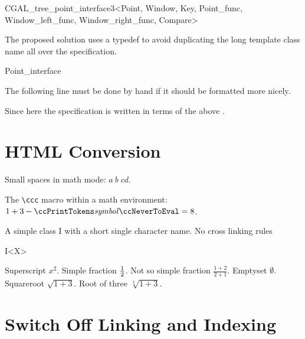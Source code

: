 \documentclass[12pt]{article}
\begin{document}
{\begin{ccClassTemplate}{CGAL_tree_point_interface3<Point, Window, Key,  
         Point_func, Window_left_func, 
         Window_right_func, Compare>}
\def\ccLongParamLayout{\ccTrue}
\def\ccLongParamLayout{\ccFalse}
\end{ccClassTemplate}

The proposed solution uses a typedef to avoid duplicating the long
template class name all over the specification.

\begin{ccClass}{Point_interface}
  
The following line must be done by hand if it should be
formatted more nicely.

       
Since here the specification is written in terms of the above
.

\end{ccClass}

\section{HTML Conversion}

Small spaces in math mode: $a\:b\;c\!d$.

The \verb+\ccc+ macro within a math environment: $1 + 3 - \ccc{symbol} = 8$.

A simple class I with a short single character name. No cross linking rules

\begin{ccClassTemplate}{I<X>}
\end{ccClassTemplate}

Superscript $x^2$.
Simple fraction ${1 \over 2}$.
Not so simple fraction $\frac{1+2}{2+1}$.
Emptyset $\emptyset$.
Squareroot $\sqrt{1+3}$.
Root of three $\sqrt[3]{1+3}$.


\section{Switch Off Linking and Indexing}

}
\end{document}

